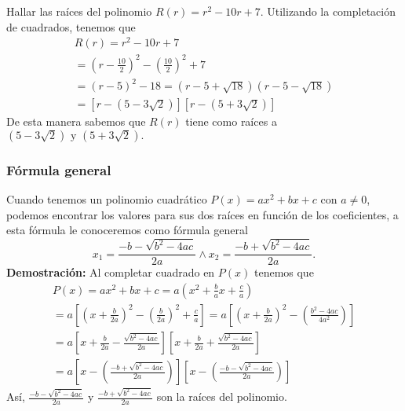 {{        \begin{example}
            Hallar las raíces del polinomio $R(r) = r^2 - 10r + 7.$
            \exampleProof
            {
                Utilizando la completación de cuadrados, tenemos que
                \begin{gather*}
                    R(r) = r^2 - 10r + 7\\
                    = \left( r - \frac{10}{2} \right)^2 - \left( \frac{10}{2} \right)^2 + 7\\
                    = \left( r - 5 \right)^2 - 18
                    = \left( r - 5 + \sqrt {18} \right)\left( r - 5 - \sqrt {18} \right)\\
                    = \left[ r - \left( 5 - 3\sqrt {2} \right)\right]\left[ r - \left( 5 + 3\sqrt {2} \right)\right]
                \end{gather*}
                De esta manera sabemos que $R(r)$ tiene como raíces a $\left( 5 - 3\sqrt {2} \right) \mbox{ y } \left( 5 + 3\sqrt {2} \right).$
            }
        \end{example}
    }
    \subsubsection{Fórmula general}
    {
        Cuando tenemos un polinomio cuadrático $P(x) = ax^2 + bx + c$ con $a \neq 0$, podemos encontrar los valores para sus dos raíces en función de los coeficientes, a esta fórmula le conoceremos como fórmula general \[x_1 = \frac{-b - \sqrt {b^2 - 4ac}}{2a} \land x_2 = \frac{-b + \sqrt {b^2 - 4ac}}{2a}.\]
        \textbf{Demostración:} Al completar cuadrado en $P(x)$ tenemos que
        \begin{gather*}
            P(x) = ax^2 + bx + c = a \left( x^2 + \frac{b}{a}x + \frac{c}{a} \right) \\
            = a \left[ \left( x + \frac{b}{2a} \right)^2 - \left( \frac{b}{2a} \right)^2 + \frac{c}{a} \right]
            = a \left[ \left( x + \frac{b}{2a} \right)^2 - \left( \frac{b^2 - 4ac}{4a^2}\right) \right] \\
            = a \left[ x + \frac{b}{2a} - \frac{\sqrt {b^2 - 4ac}}{2a}\right]\left[ x + \frac{b}{2a} + \frac{\sqrt {b^2 - 4ac}}{2a}\right] \\
            = a \left[ x - \left( \frac{-b + \sqrt {b^2 - 4ac}}{2a} \right) \right]\left[ x - \left( \frac{-b - \sqrt {b^2 - 4ac}}{2a} \right) \right]
        \end{gather*}
        Así, $\frac{-b - \sqrt {b^2 - 4ac}}{2a}$ y $\frac{-b + \sqrt {b^2 - 4ac}}{2a}$ son la raíces del polinomio.
    }

}
